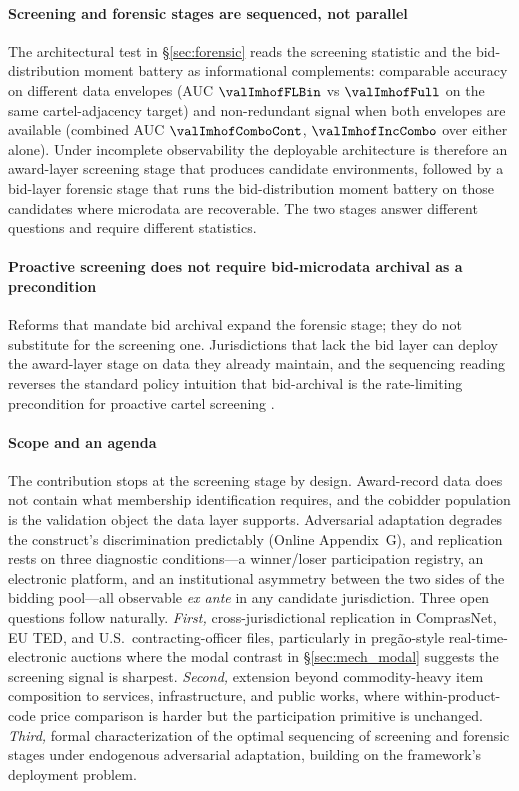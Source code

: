 \paragraph{Screening and forensic stages are sequenced, not
parallel} The architectural test in §\ref{sec:forensic} reads
the screening statistic and the bid-distribution moment battery
as informational complements: comparable accuracy on different
data envelopes (AUC $\valImhofFLBin$ vs $\valImhofFull$ on the
same cartel-adjacency target) and non-redundant signal when
both envelopes are available (combined AUC
$\valImhofComboCont$, $\valImhofIncCombo$ over either alone). Under incomplete observability the deployable
architecture is therefore an award-layer screening stage that
produces candidate environments, followed by a bid-layer
forensic stage that runs the bid-distribution moment battery on
those candidates where microdata are recoverable. The two
stages answer different questions and require different
statistics.

\paragraph{Proactive screening does not require bid-microdata
archival as a precondition} Reforms that mandate bid archival
expand the forensic stage; they do not substitute for the
screening one. Jurisdictions that lack the bid layer can deploy
the award-layer stage on data they already maintain, and the
sequencing reading reverses the standard policy intuition that
bid-archival is the rate-limiting precondition for proactive
cartel screening
\citep{becker1968crime,stigler1970optimum,baker2002case,harrington2008detecting}.

\paragraph{Scope and an agenda}
The contribution stops at the screening stage by design.
Award-record data does not contain what membership identification
requires, and the cobidder population is the validation object
the data layer supports. Adversarial adaptation degrades the construct's
discrimination predictably (Online Appendix~G), and replication
rests on three diagnostic conditions---a winner/loser
participation registry, an electronic platform, and an
institutional asymmetry between the two sides of the bidding
pool---all observable \emph{ex ante} in any candidate
jurisdiction. Three open questions follow naturally.
\emph{First,} cross-jurisdictional replication in
ComprasNet, EU TED, and U.S.~contracting-officer files,
particularly in pregão-style real-time-electronic auctions
where the modal contrast in §\ref{sec:mech_modal} suggests the
screening signal is sharpest. \emph{Second,} extension beyond
commodity-heavy item composition to services, infrastructure,
and public works, where within-product-code price comparison
is harder but the participation primitive is unchanged.
\emph{Third,} formal characterization of the optimal sequencing
of screening and forensic stages under endogenous adversarial
adaptation, building on the framework's deployment problem.

